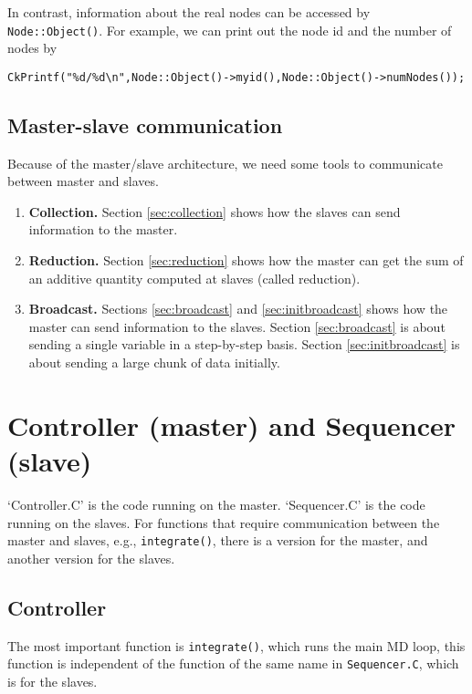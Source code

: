 \documentclass{article}
\begin{document}
In contrast, information about the real nodes
can be accessed by \texttt{Node::Object()}.
%
For example, we can print out the node id and the number of nodes by
\begin{lstlisting}
CkPrintf("%d/%d\n",Node::Object()->myid(),Node::Object()->numNodes());
\end{lstlisting}


\subsection{Master-slave communication}

Because of the master/slave architecture,
we need some tools to communicate between master and slaves.
%
\begin{enumerate}
  \item \textbf{Collection.}
    Section \ref{sec:collection} shows how the slaves
    can send information to the master.

  \item \textbf{Reduction.}
    Section \ref{sec:reduction} shows how the master
    can get the sum of an additive quantity
    computed at slaves (called reduction).

  \item \textbf{Broadcast.}
    Sections \ref{sec:broadcast} and \ref{sec:initbroadcast}
    shows how the master can send information to the slaves.
    Section \ref{sec:broadcast} is about sending a
    single variable in a step-by-step basis.
    Section \ref{sec:initbroadcast} is about sending
    a large chunk of data initially.
\end{enumerate}
%


\section{Controller (master) and Sequencer (slave)}

`Controller.C' is the code running on the master.
`Sequencer.C' is the code running on the slaves.
For functions that require communication between
the master and slaves, e.g., \texttt{integrate()},
there is a version for the master,
and another version for the slaves.

\subsection{Controller}

The most important function is \texttt{integrate()},
which runs the main MD loop,
this function is independent of the function of the same name
in \texttt{Sequencer.C},
which is for the slaves.
\end{document}
